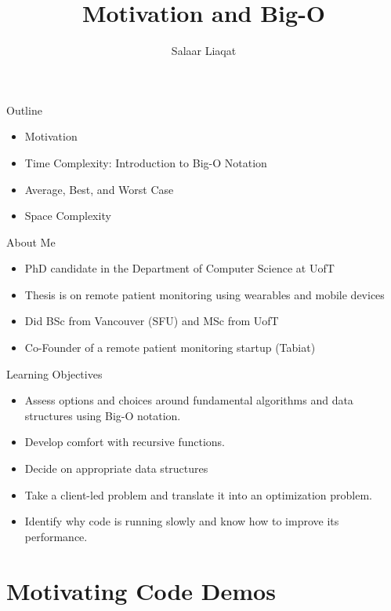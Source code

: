 \documentclass[
  ignorenonframetext,
]{beamer}
\title{Motivation and Big-O}
\author{Salaar Liaqat}
\date{}
\institute{Data Sciences Institute, UofT}
\begin{document}
\frame{\titlepage}
\ifdefined\Shaded\renewenvironment{Shaded}{\begin{tcolorbox}[sharp corners, boxrule=0pt, borderline west={3pt}{0pt}{shadecolor}, breakable, interior hidden, enhanced, frame hidden]}{\end{tcolorbox}}\fi

\begin{frame}{Outline}
\protect\hypertarget{outline}{}
\begin{itemize}
\item
  Motivation
\item
  Time Complexity: Introduction to Big-O Notation
\item
  Average, Best, and Worst Case
\item
  Space Complexity
\end{itemize}
\end{frame}

\begin{frame}{About Me}
\protect\hypertarget{about-me}{}
\begin{itemize}
\item
  PhD candidate in the Department of Computer Science at UofT
\item
  Thesis is on remote patient monitoring using wearables and mobile
  devices
\item
  Did BSc from Vancouver (SFU) and MSc from UofT
\item
  Co-Founder of a remote patient monitoring startup (Tabiat)
\end{itemize}
\end{frame}

\begin{frame}{Learning Objectives}
\protect\hypertarget{learning-objectives}{}
\begin{itemize}
\item
  Assess options and choices around fundamental algorithms and data
  structures using Big-O notation.
\item
  Develop comfort with recursive functions.
\item
  Decide on appropriate data structures
\item
  Take a client-led problem and translate it into an optimization
  problem.
\item
  Identify why code is running slowly and know how to improve its
  performance.
\end{itemize}
\end{frame}

\hypertarget{motivating-code-demos}{%
\section{Motivating Code Demos}\label{motivating-code-demos}}
\end{document}

